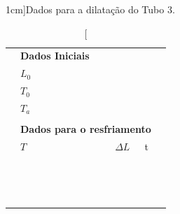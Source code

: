 \begin{table}[!ht]
\caption[][1cm]{Dados para a dilatação do Tubo 3.}
\label{Tab:DadosTubo3}
\centering
	\begin{tabular}{lllll}
		\toprule
		&\textbf{Dados Iniciais}\\
		\cmidrule{2-3}
		& \cellcolor[gray]{0.89}$L_0$ &\cellcolor[gray]{0.92}\\
		& \cellcolor[gray]{0.95}$T_0$ & \cellcolor[gray]{0.97}\\
		& \cellcolor[gray]{0.89}$T_a$ & \cellcolor[gray]{0.92}\\
		\cmidrule{2-3}
\\
		&\multicolumn{3}{l}{\textbf{Dados para o resfriamento}} \\
		\cmidrule{2-4}
		& $T$ & $\Delta L$ & t &\\
		\cmidrule{2-4}
		& \cellcolor[gray]{0.89} \phantom{xxxxxxxxxxxxxxxxxxxx}& \cellcolor[gray]{0.92} \phantom{xxxxxxxxxxxxxxxxxxxx} &  \cellcolor[gray]{0.89} \phantom{xxxxxxxxxxxxxxxxxxxx} \\
		& \cellcolor[gray]{0.95} & \cellcolor[gray]{0.97} & \cellcolor[gray]{0.95} \\
		& \cellcolor[gray]{0.89} & \cellcolor[gray]{0.92} & \cellcolor[gray]{0.89} \\
		& \cellcolor[gray]{0.95} & \cellcolor[gray]{0.97} & \cellcolor[gray]{0.95} \\
		& \cellcolor[gray]{0.89} & \cellcolor[gray]{0.92} & \cellcolor[gray]{0.89} \\
		& \cellcolor[gray]{0.95} & \cellcolor[gray]{0.97} & \cellcolor[gray]{0.95} \\
		& \cellcolor[gray]{0.89} & \cellcolor[gray]{0.92} & \cellcolor[gray]{0.89} \\
		& \cellcolor[gray]{0.95} & \cellcolor[gray]{0.97} & \cellcolor[gray]{0.95} \\
		& \cellcolor[gray]{0.89} & \cellcolor[gray]{0.92} & \cellcolor[gray]{0.89} \\
		& \cellcolor[gray]{0.95} & \cellcolor[gray]{0.97} & \cellcolor[gray]{0.95} \\
		& \cellcolor[gray]{0.89} & \cellcolor[gray]{0.92} & \cellcolor[gray]{0.89} \\
		& \cellcolor[gray]{0.95} & \cellcolor[gray]{0.97} & \cellcolor[gray]{0.95} \\
		& \cellcolor[gray]{0.89} & \cellcolor[gray]{0.92} & \cellcolor[gray]{0.89} \\
		& \cellcolor[gray]{0.95} & \cellcolor[gray]{0.97} & \cellcolor[gray]{0.95} \\

\end{tabular}
\end{table}
